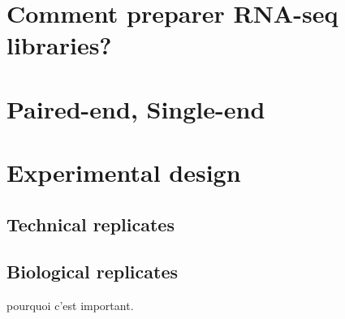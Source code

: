 \section{Comment preparer RNA-seq libraries?}

\section{Paired-end, Single-end}

\section{Experimental design}
\subsection{Technical replicates}
\subsection{Biological replicates}
pourquoi c'est important.
